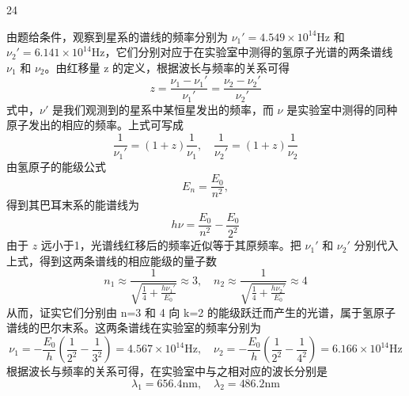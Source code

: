 \begin{solution}{24}
    \begin{subsolution}
        由题给条件，观察到星系的谱线的频率分别为 $\nu_1' = 4.549 \times 10^{14}\mathrm{Hz}$ 和 $\nu_2' = 6.141 \times 10^{14}\mathrm{Hz}$，它们分别对应于在实验室中测得的氢原子光谱的两条谱线 $\nu_1$ 和 $\nu_2$。由红移量 z 的定义，根据波长与频率的关系可得
        \begin{equation}
            z = \frac{\nu_1 - \nu_1'}{\nu_1'} = \frac{\nu_2 - \nu_2'}{\nu_2'}
            \label{eq:1.s24}
        \end{equation}
        式中，$\nu'$ 是我们观测到的星系中某恒星发出的频率，而 $\nu$ 是实验室中测得的同种原子发出的相应的频率。上式可写成
        \begin{equation*}
            \frac{1}{\nu_1'} = (1 + z)\frac{1}{\nu_1}, \quad \frac{1}{\nu_2'} = (1 + z)\frac{1}{\nu_2}
        \end{equation*}
        由氢原子的能级公式
        \begin{equation}
            E_n = \frac{E_0}{n^2},
            \label{eq:2.s24}
        \end{equation}
        得到其巴耳末系的能谱线为
        \begin{equation}
            h\nu = \frac{E_0}{n^2} - \frac{E_0}{2^2}
            \label{eq:3.s24}
        \end{equation}
        由于 $z$ 远小于1，光谱线红移后的频率近似等于其原频率。把 $\nu_1'$ 和 $\nu_2'$ 分别代入上式，得到这两条谱线的相应能级的量子数
        \begin{equation}
            n_1 \approx \frac{1}{\sqrt{\frac{1}{4} + \frac{h\nu_1'}{E_0}}} \approx 3, \quad n_2 \approx \frac{1}{\sqrt{\frac{1}{4} + \frac{h\nu_2'}{E_0}}} \approx 4
            \label{eq:4.s24}
        \end{equation}
        从而，证实它们分别由 n=3 和 4 向 k=2 的能级跃迁而产生的光谱，属于氢原子谱线的巴尔末系。这两条谱线在实验室的频率分别为
        \begin{equation*}
            \nu_1 = -\frac{E_0}{h}\left(\frac{1}{2^2} - \frac{1}{3^2}\right) = 4.567 \times 10^{14}\mathrm{Hz}, \quad \nu_2 = -\frac{E_0}{h}\left(\frac{1}{2^2} - \frac{1}{4^2}\right) = 6.166 \times 10^{14}\mathrm{Hz}
        \end{equation*}
        根据波长与频率的关系可得，在实验室中与之相对应的波长分别是
        \begin{equation}
            \lambda_1 = 656.4\mathrm{nm}, \quad \lambda_2 = 486.2\mathrm{nm}
            \label{eq:5.s24}
        \end{equation}

\end{subsolution}
\end{solution}
